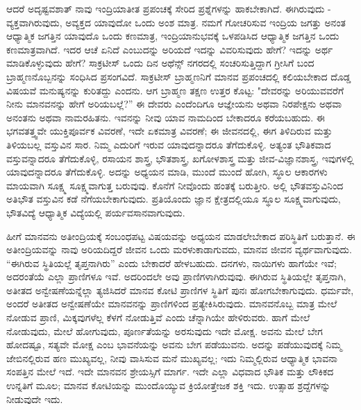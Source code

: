 ಆದರೆ ಅದೃಷ್ಟವಶಾತ್ ನಾವು ಇಂದ್ರಿಯಾತೀತ ಪ್ರಪಂಚಕ್ಕೆ ಸೇರಿದ ಪ್ರಶ್ನೆಗಳನ್ನು ಹಾಕಬೇಕಾಗಿದೆ. ಈಗಿರುವುದು - ವ್ಯಕ್ತವಾಗಿರುವುದು, ಅವ್ಯಕ್ತದ ಯಾವುದೋ ಒಂದು ಅಂಶ ಮಾತ್ರ. ನಮಗೆ ಗೋಚರಿಸುವ ಇಂದ್ರಿಯ ಜಗತ್ತು ಅನಂತ ಆಧ್ಯಾತ್ಮಿಕ ಜಗತ್ತಿನ ಯಾವುದೊ ಒಂದು ಕಣಮಾತ್ರ, ಇಂದ್ರಿಯಾನುಭವಕ್ಕೆ ಒಳಪಡಿಸಿದ ಆಧ್ಯಾತ್ಮಿಕ ಜಗತ್ತಿನ ಒಂದು ಕಣಮಾತ್ರವಾಗಿದೆ. ಇದರ ಆಚೆ ಏನಿದೆ ಎಂಬುದನ್ನು ಅರಿಯದೆ ಇದನ್ನು ವಿವರಿಸುವುದು ಹೇಗೆ? ಇದನ್ನು ಅರ್ಥ ಮಾಡಿಕೊಳ್ಳುವುದು ಹೇಗೆ? ಸಾಕ್ರಟೀಸ್ ಒಂದು ದಿನ ಅಥೆನ್ಸ್ ನಗರದಲ್ಲಿ ಸಂಚರಿಸುತ್ತಿದ್ದಾಗ ಗ್ರೀಸಿಗೆ ಬಂದ ಬ್ರಾಹ್ಮಣನೊಬ್ಬನನ್ನು ಸಂಧಿಸಿದ ಪ್ರಸಂಗವಿದೆ. ಸಾಕ್ರಟೀಸ್ ಬ್ರಾಹ್ಮಣನಿಗೆ ಮಾನವ ಪ್ರಪಂಚದಲ್ಲಿ ಕಲಿಯಬೇಕಾದ ದೊಡ್ಡ ವಿಷಯವೆ ಮನುಷ್ಯನನ್ನು ಕುರಿತದ್ದು ಎಂದನು. ಆಗ ಬ್ರಾಹ್ಮಣ ತಕ್ಷಣ ಉತ್ತರ ಕೊಟ್ಟ: "ದೇವರನ್ನು ಅರಿಯುವವರೆಗೆ ನೀನು ಮಾನವನನ್ನು ಹೇಗೆ ಅರಿಯಬಲ್ಲೆ?” ಈ ದೇವರು ಎಂದೆಂದಿಗೂ ಆಜ್ಞೇಯನು ಅಥವಾ ನಿರಪೇಕ್ಷನು ಅಥವಾ ಅನಂತನು ಅಥವಾ ನಾಮರಹಿತನು. ಇವನನ್ನು ನೀವು ಯಾವ ನಾಮದಿಂದ ಬೇಕಾದರೂ ಕರೆಯಬಹುದು. ಈ ಭಗವತತ್ತ್ವವೇ ಯುಕ್ತಿಪೂರ್ವಕ ವಿವರಣೆ, ಇದೇ ಏಕಮಾತ್ರ ವಿವರಣೆ; ಈ ಜೀವನದಲ್ಲಿ, ಈಗ ತಿಳಿದಿರುವ ಮತ್ತು ತಿಳಿಯಬಲ್ಲ ವಸ್ತುವಿನ ಸಾರ. ನಿಮ್ಮ ಎದುರಿಗೆ ಇರುವ ಯಾವುದನ್ನಾದರೂ ತೆಗೆದುಕೊಳ್ಳಿ. ಅತ್ಯಂತ ಭೌತಿಕವಾದ ವಸ್ತುವನ್ನಾದರೂ ತೆಗೆದುಕೊಳ್ಳಿ, ರಸಾಯನ ಶಾಸ್ತ್ರ, ಭೌತಶಾಸ್ತ್ರ, ಖಗೋಳಶಾಸ್ತ್ರ ಮತ್ತು ಜೀವ-ವಿಜ್ಞಾನಶಾಸ್ತ್ರ, ಇವುಗಳಲ್ಲಿ ಯಾವುದನ್ನಾದರೂ ತೆಗೆದುಕೊಳ್ಳಿ. ಅದನ್ನು ಅಧ್ಯಯನ ಮಾಡಿ, ಮುಂದೆ ಮುಂದೆ ಹೋಗಿ, ಸ್ಥೂಲ ಆಕಾರಗಳು ಮಾಯವಾಗಿ ಸೂಕ್ಷ್ಮ ಸೂಕ್ಷ್ಮವಾಗುತ್ತ ಬರುವುವು. ಕೊನೆಗೆ ನೀವೊಂದು ಹಂತಕ್ಕೆ ಬರುತ್ತೀರಿ. ಅಲ್ಲಿ ಭೌತವಸ್ತುವಿನಿಂದ ಅತಿಭೌತ ವಸ್ತುವಿನ ಕಡೆ ನೆಗೆಯಬೇಕಾಗುವುದು. ಪ್ರತಿಯೊಂದು ಜ್ಞಾನ ಕ್ಷೇತ್ರದಲ್ಲಿಯೂ ಸ್ಥೂಲ ಸೂಕ್ಷ್ಮವಾಗುವುದು, ಭೌತವಿದ್ಯೆ ಆಧ್ಯಾತ್ಮಿಕ ವಿದ್ಯೆಯಲ್ಲಿ ಪರ್ಯವಸಾನವಾಗುವುದು.

ಹೀಗೆ ಮಾನವನು ಅತೀಂದ್ರಿಯಕ್ಕೆ ಸಂಬಂಧಪಟ್ಟ ವಿಷಯವನ್ನು ಅಧ್ಯಯನ ಮಾಡಲೇಬೇಕಾದ ಪರಿಸ್ಥಿತಿಗೆ ಬರುತ್ತಾನೆ. ಈ ಅತೀಂದ್ರಿಯವನ್ನು ನಾವು ಅರಿಯದಿದ್ದರೆ ಜೀವನ ಒಂದು ಮರಳುಕಾಡಾಗುವದು, ಮಾನವ ಜೀವನ ವ್ಯರ್ಥವಾಗುವುದು. “ಈಗಿರುವ ಸ್ಥಿತಿಯಲ್ಲೆ ತೃಪ್ತನಾಗಿರು'' ಎಂದು ಬೇಕಾದರೆ ಹೇಳಬಹುದು. ದನಗಳು, ನಾಯಿಗಳು ಹಾಗೆಯೇ ಇವೆ; ಅದರಂತೆಯೆ ಎಲ್ಲಾ ಪ್ರಾಣಿಗಳೂ ಇವೆ. ಅದರಿಂದಲೇ ಅವು ಪ್ರಾಣಿಗಳಾಗಿರುವುವು. ಈಗಿರುವ ಸ್ಥಿತಿಯಲ್ಲೇ ತೃಪ್ತನಾಗಿ, ಅತೀತದ ಅನ್ವೇಷಣೆಯನ್ನೆಲ್ಲಾ ತ್ಯಜಿಸಿದರೆ ಮಾನವ ಕೋಟಿ ಪ್ರಾಣಿಗಳ ಸ್ಥಿತಿಗೆ ಪುನಃ ಹೋಗಬೇಕಾಗುವುದು. ಧರ್ಮವೇ, ಅಂದರೆ ಅತೀತದ ಅನ್ವೇಷಣೆಯೇ ಮಾನವನನ್ನು ಪ್ರಾಣಿಗಳಿಂದ ಪ್ರತ್ಯೇಕಿಸಿರುವುದು. ಮಾನವನೊಬ್ಬ ಮಾತ್ರ ಮೇಲೆ ನೋಡುವ ಪ್ರಾಣಿ, ಮಿಕ್ಕವುಗಳೆಲ್ಲ ಕೆಳಗೆ ನೋಡುತ್ತಿವೆ ಎಂದು ಚೆನ್ನಾಗಿಯೇ ಹೇಳಿರುವರು. ಹಾಗೆ ಮೇಲೆ ನೋಡುವುದು, ಮೇಲೆ ಹೋಗುವುದು, ಪೂರ್ಣತೆಯನ್ನು ಅರಸುವುದು ಇದೇ ಮೋಕ್ಷ. ಅವನು ಮೇಲೆ ಬೇಗ ಹೋದಷ್ಟೂ, ಸತ್ಯವೇ ಮೋಕ್ಷ ಎಂಬ ಭಾವನೆಯನ್ನು ಅವನು ಬೇಗ ಪಡೆಯುವನು. ಅದನ್ನು ಪಡೆಯುವುದಕ್ಕೆ ನಿಮ್ಮ ಜೇಬಿನಲ್ಲಿರುವ ಹಣ ಮುಖ್ಯವಲ್ಲ, ನೀವು ವಾಸಿಸುವ ಮನೆ ಮುಖ್ಯವಲ್ಲ; ಇದು ನಿಮ್ಮಲ್ಲಿರುವ ಆಧ್ಯಾತ್ಮಿಕ ಭಾವನಾ ಸಂಪತ್ತಿನ ಮೇಲೆ ಇದೆ. ಇದೇ ಮಾನವನ ಶ್ರೇಯಸ್ಸಿಗೆ ಮಾರ್ಗ. ಇದೇ ಎಲ್ಲಾ ವಿಧವಾದ ಭೌತಿಕ ಮತ್ತು ಲೌಕಿಕದ ಉನ್ನತಿಗೆ ಮೂಲ; ಮಾನವ ಕೋಟಿಯನ್ನು ಮುಂದೊಯ್ಯುವ ಕ್ರಿಯೋತ್ತೇಜಕ ಶಕ್ತಿ ಇದು. ಉತ್ಸಾಹ ಶ್ರದ್ದೆಗಳನ್ನು ನೀಡುವುದೇ ಇದು.

